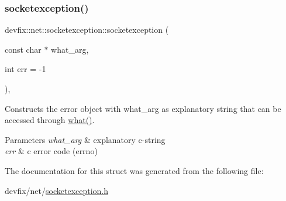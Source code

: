 \subsubsection{\texorpdfstring{socketexception()}{socketexception()}\hspace{0.1cm}{\footnotesize\ttfamily [2/2]}}
{\footnotesize\ttfamily devfix\+::net\+::socketexception\+::socketexception (\begin{DoxyParamCaption}\item[{const char $\ast$}]{what\+\_\+arg,  }\item[{int}]{err = {\ttfamily -\/1} }\end{DoxyParamCaption})\hspace{0.3cm}{\ttfamily [inline]}, {\ttfamily [explicit]}}

Constructs the error object with what\+\_\+arg as explanatory string that can be accessed through \hyperlink{structdevfix_1_1base_1_1error_1_1baseexception_a16327152a55d65b1e537825231fbd452}{what()}. 
\begin{DoxyParams}{Parameters}
{\em what\+\_\+arg} & explanatory c-\/string \\
\hline
{\em err} & c error code (errno) \\
\hline
\end{DoxyParams}


The documentation for this struct was generated from the following file\+:\begin{DoxyCompactItemize}
\item 
devfix/net/\hyperlink{socketexception_8h}{socketexception.\+h}\end{DoxyCompactItemize}
